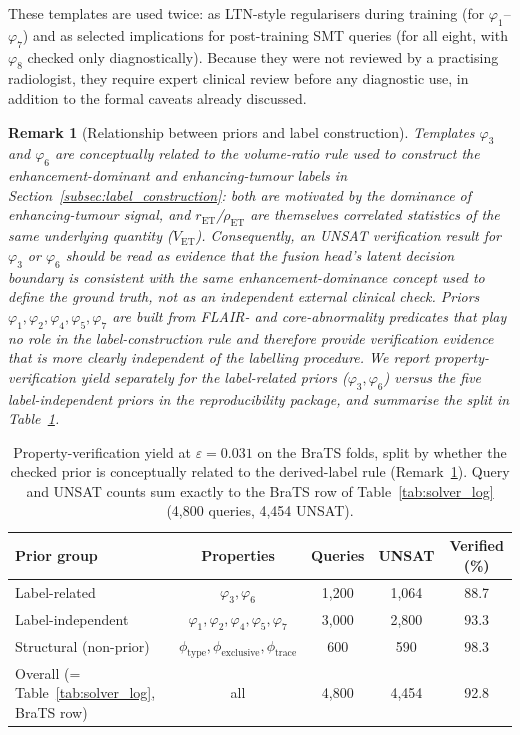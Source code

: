 \documentclass[preprint,11pt]{elsarticle}
\newtheorem{remark}{Remark}
\newcommand{\eps}{\varepsilon}
\begin{document}
These templates are used twice: as LTN-style regularisers during training (for $\varphi_1$--$\varphi_7$) and as selected implications for post-training SMT queries (for all eight, with $\varphi_8$ checked only diagnostically). Because they were not reviewed by a practising radiologist, they require expert clinical review before any diagnostic use, in addition to the formal caveats already discussed.

\begin{remark}[Relationship between priors and label construction]
\label{rem:prior_independence}
Templates $\varphi_3$ and $\varphi_6$ are conceptually related to the volume-ratio rule used to construct the enhancement-dominant and enhancing-tumour labels in Section~\ref{subsec:label_construction}: both are motivated by the dominance of enhancing-tumour signal, and $r_{\mathrm{ET}}$/$\rho_{\mathrm{ET}}$ are themselves correlated statistics of the same underlying quantity ($V_{\mathrm{ET}}$). Consequently, an UNSAT verification result for $\varphi_3$ or $\varphi_6$ should be read as evidence that the fusion head's latent decision boundary is consistent with the same enhancement-dominance concept used to define the ground truth, not as an independent external clinical check. Priors $\varphi_1,\varphi_2,\varphi_4,\varphi_5,\varphi_7$ are built from FLAIR- and core-abnormality predicates that play no role in the label-construction rule and therefore provide verification evidence that is more clearly independent of the labelling procedure. We report property-verification yield separately for the label-related priors ($\varphi_3,\varphi_6$) versus the five label-independent priors in the reproducibility package, and summarise the split in Table~\ref{tab:prior_independence_split}.
\end{remark}

\begin{table}[H]
\centering
\caption{Property-verification yield at $\eps=0.031$ on the BraTS folds, split by whether the checked prior is conceptually related to the derived-label rule (Remark~\ref{rem:prior_independence}). Query and UNSAT counts sum exactly to the BraTS row of Table~\ref{tab:solver_log} (4,800 queries, 4,454 UNSAT).}
\label{tab:prior_independence_split}
\scriptsize
\begin{tabular}{lcccc}
\toprule
\textbf{Prior group} & \textbf{Properties} & \textbf{Queries} & \textbf{UNSAT} & \textbf{Verified (\%)} \\
\midrule
Label-related & $\varphi_3,\varphi_6$ & 1,200 & 1,064 & 88.7 \\
Label-independent & $\varphi_1,\varphi_2,\varphi_4,\varphi_5,\varphi_7$ & 3,000 & 2,800 & 93.3 \\
Structural (non-prior) & $\phi_{\mathrm{type}},\phi_{\mathrm{exclusive}},\phi_{\mathrm{trace}}$ & 600 & 590 & 98.3 \\
\midrule
Overall (= Table~\ref{tab:solver_log}, BraTS row) & all & 4,800 & 4,454 & 92.8 \\
\bottomrule
\end{tabular}
\end{table}
\end{document}
